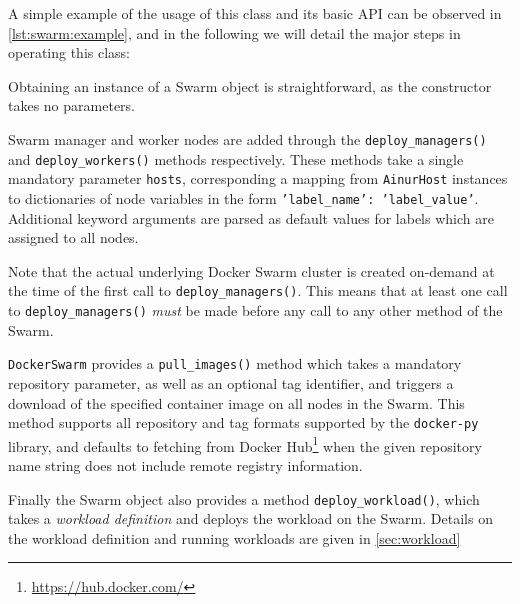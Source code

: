 A simple example of the usage of this class and its basic \gls{API} can be observed in \cref{lst:swarm:example}, and in the following we will detail the major steps in operating this class:
\begin{description}[]
    \item[Instantiating a \texttt{DockerSwarm} object.]
    Obtaining an instance of a Swarm object is straightforward, as the constructor takes no parameters.
    \item[Adding Swarm nodes.]
    Swarm manager and worker nodes are added through the \texttt{deploy_managers()} and \texttt{deploy_workers()} methods respectively.
    These methods take a single mandatory parameter \texttt{hosts}, corresponding a mapping from \texttt{AinurHost} instances to dictionaries of node variables in the form \texttt{{'label_name': 'label_value'}}.
    Additional keyword arguments are parsed as default values for labels which are assigned to all nodes.

    Note that the actual underlying Docker Swarm cluster is created on-demand at the time of the first call to \texttt{deploy_managers()}.
    This means that at least one call to \texttt{deploy_managers()} \emph{must} be made before any call to any other method of the Swarm.
    \item[Fetching required container images.]
    \texttt{DockerSwarm} provides a \texttt{pull_images()} method which takes a mandatory repository parameter, as well as an optional tag identifier, and triggers a download of the specified container image on all nodes in the Swarm.
    This method supports all repository and tag formats supported by the \verb|docker-py| library, and defaults to fetching from Docker Hub\footnote{\url{https://hub.docker.com/}} when the given repository name string does not include remote registry information.
    \item[Workload Deployment.]
    Finally the Swarm object also provides a method \texttt{deploy_workload()}, which takes a \emph{workload definition} and deploys the workload on the Swarm.
    Details on the workload definition and running workloads are given in \cref{sec:workload} 
\end{description}
